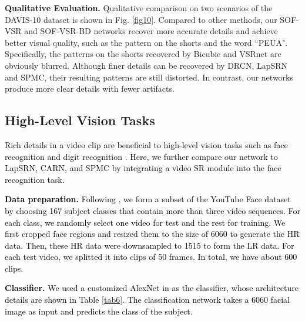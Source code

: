 \documentclass[journal]{IEEEtran}
\begin{document}
\begin{table*}[htp]
	\textbf{Qualitative Evaluation.} Qualitative comparison on two scenarios of the DAVIS-10 dataset is shown in Fig. \ref{fig10}. Compared to other methods, our SOF-VSR and SOF-VSR-BD networks recover more accurate details and achieve better visual quality, such as the pattern on the shorts and the word ``PEUA". Specifically, the patterns on the shorts recovered by Bicubic and VSRnet are obviously blurred. Although finer details can be recovered by DRCN, LapSRN and SPMC, their resulting patterns are still distorted. In contrast, our networks produce more clear details with fewer artifacts.
	
	
	\subsection{High-Level Vision Tasks}

	\textcolor{black}{
	Rich details in a video clip are beneficial to high-level vision tasks such as face recognition and digit recognition \cite{2016-IsImageSuperResolutionHelpfulforOtherVisionTasks?-Dai-1-9}. Here, we further compare our network to LapSRN, CARN, and SPMC by integrating a video SR module into the face recognition task.}
	
	\textcolor{black}{
	\textbf{Data preparation.} Following  \cite{2018-LearningTemporalDynamicsforVideoSuperResolution:aDeepLearningApproach-Liu--}, we form a subset of the YouTube Face dataset \cite{2011-FaceRecognitioninUnconstrainedVideoswithMatchedBackgroundSimilarity-Wolf-529-534} by choosing 167 subject classes that contain more than three video sequences. For each class, we randomly select one video for test and the rest for training. We first cropped face regions and resized them to the size of 6060 to generate the HR data. Then, these HR data were downsampled to 1515 to form the LR data. For each test video, we splitted it into clips of 50 frames. In total, we have about 600 clips.}
	
	\textcolor{black}{
	\textbf{Classifier.} We used a customized AlexNet in \cite{2012-ImagenetClassificationwithDeepConvolutionalNeuralNetworks-Krizhevsky-1097-1105} as the classifier, whose architecture details are shown in Table \ref{tab6}. The classification network takes a 6060 facial image as input and predicts the class of the subject.} 
	

\end{table*}
\end{document}
